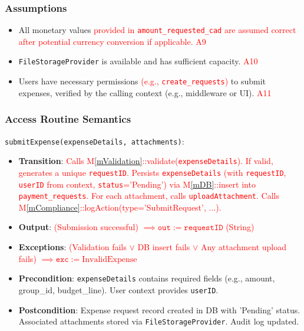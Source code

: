 \documentclass[12pt, titlepage]{article}
\providecommand{\mref}[1]{M\ref{#1}}
\begin{document}
\subsubsection{Assumptions}
\begin{itemize}
    \item All monetary values \textcolor{red}{provided in \texttt{amount\_requested\_cad} are assumed correct after potential currency conversion if applicable. A9}
    \item \texttt{FileStorageProvider} is available and has sufficient capacity. \textcolor{red}{A10}
    \item Users have necessary permissions \textcolor{red}{(e.g., \texttt{create\_requests})} to submit expenses, verified by the calling context (e.g., middleware or UI). \textcolor{red}{A11}
\end{itemize}

\subsubsection{Access Routine Semantics}
\noindent \texttt{submitExpense(expenseDetails, attachments)}:
\begin{itemize}
    \item \textbf{Transition}: \textcolor{red}{Calls \mref{mValidation}::validate(\texttt{expenseDetails}). If valid, generates a unique \texttt{requestID}. Persists \texttt{expenseDetails} (with \texttt{requestID}, \texttt{userID} from context, \texttt{status}='Pending') via \mref{mDB}::insert into \texttt{payment\_requests}. For each attachment, calls \texttt{uploadAttachment}. Calls \mref{mCompliance}::logAction(type='SubmitRequest', ...).}
    \item \textbf{Output}: \textcolor{red}{(Submission successful) $\implies \texttt{out} := \texttt{requestID}$ (String)}
    \item \textbf{Exceptions}: \textcolor{red}{(Validation fails $\lor$ DB insert fails $\lor$ Any attachment upload fails) $\implies \texttt{exc} := \text{InvalidExpense}$}
    \item \textbf{Precondition}: \texttt{expenseDetails} contains required fields (e.g., amount, group\_id, budget\_line). User context provides \texttt{userID}.
    \item \textbf{Postcondition}: Expense request record created in DB with 'Pending' status. Associated attachments stored via \texttt{FileStorageProvider}. Audit log updated.
\end{itemize}
\end{document}
